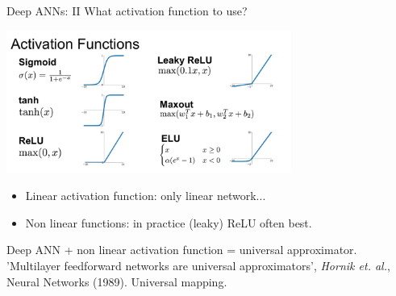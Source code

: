 \documentclass{beamer}
\begin{document}
\begin{frame}{Deep ANNs: II}
    What activation function to use?

    \begin{center}
      \includegraphics[width=0.7\textwidth]{./Figures/ANNs_supervised_learning/activation_functions}
    \end{center}

    \begin{itemize}
      \item Linear activation function: only linear network...
      \item Non linear functions: in practice (leaky) ReLU often best.
    \end{itemize}

    Deep ANN + non linear activation function = universal approximator. 'Multilayer feedforward networks are universal approximators', \textit{Hornik et. al.}, Neural Networks (1989). Universal mapping.
\end{frame}
\end{document}
